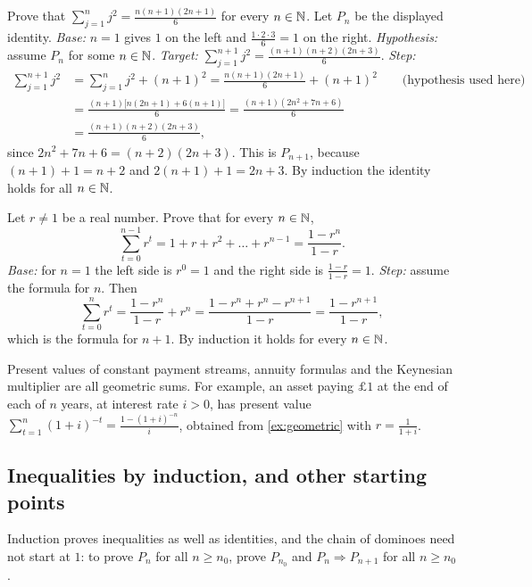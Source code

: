 \begin{example}
Prove that $\displaystyle\sum_{j=1}^{n}j^2=\frac{n(n+1)(2n+1)}{6}$ for every $n\in\mathbb{N}$. 
\solution
Let $P_n$ be the displayed identity.
\emph{Base:} $n=1$ gives $1$ on the left and $\frac{1\cdot2\cdot3}{6}=1$ on the right.
\emph{Hypothesis:} assume $P_n$ for some $n\in\mathbb{N}$.
\emph{Target:} $\sum_{j=1}^{n+1}j^2=\frac{(n+1)(n+2)(2n+3)}6$.
\emph{Step:}
\begin{align*}
\sum_{j=1}^{n+1}j^2&=\sum_{j=1}^{n}j^2+(n+1)^2=\frac{n(n+1)(2n+1)}{6}+(n+1)^2 \qquad\text{(hypothesis used here)}\\
&=\frac{(n+1)\big[n(2n+1)+6(n+1)\big]}{6}=\frac{(n+1)(2n^2+7n+6)}{6}\\
&=\frac{(n+1)(n+2)(2n+3)}{6},
\end{align*}
since $2n^2+7n+6=(n+2)(2n+3)$. This is $P_{n+1}$, because $(n+1)+1=n+2$ and $2(n+1)+1=2n+3$. By induction the
identity holds for all $n\in\mathbb{N}$.
\end{example}

\begin{example}
Let $r\ne1$ be a real number. Prove that for every $n\in\mathbb{N}$,
\[
\sum_{t=0}^{n-1}r^t=1+r+r^2+\dots+r^{n-1}=\frac{1-r^n}{1-r}.
\]
\solution
\emph{Base:} for $n=1$ the left side is $r^0=1$ and the right side is $\frac{1-r}{1-r}=1$.
\emph{Step:} assume the formula for $n$. Then
\[
\sum_{t=0}^{n}r^t=\frac{1-r^n}{1-r}+r^n=\frac{1-r^n+r^n-r^{n+1}}{1-r}=\frac{1-r^{n+1}}{1-r},
\]
which is the formula for $n+1$. By induction it holds for every $n\in\mathbb{N}$.
\end{example}

\begin{external}
Present values of constant payment streams, annuity formulas and the Keynesian multiplier are all geometric sums.
For example, an asset paying $\pounds1$ at the end of each of $n$ years, at interest rate $i>0$, has present value
$\sum_{t=1}^{n}(1+i)^{-t}=\frac{1-(1+i)^{-n}}{i}$, obtained from \cref{ex:geometric} with $r=\frac{1}{1+i}$.
\end{external}

\subsection{Inequalities by induction, and other starting points}

Induction proves inequalities as well as identities, and the chain of dominoes need not start at $1$: to prove $P_n$
for all $n\ge n_0$, prove $P_{n_0}$ and $P_n\Rightarrow P_{n+1}$ for all $n\ge n_0$.

